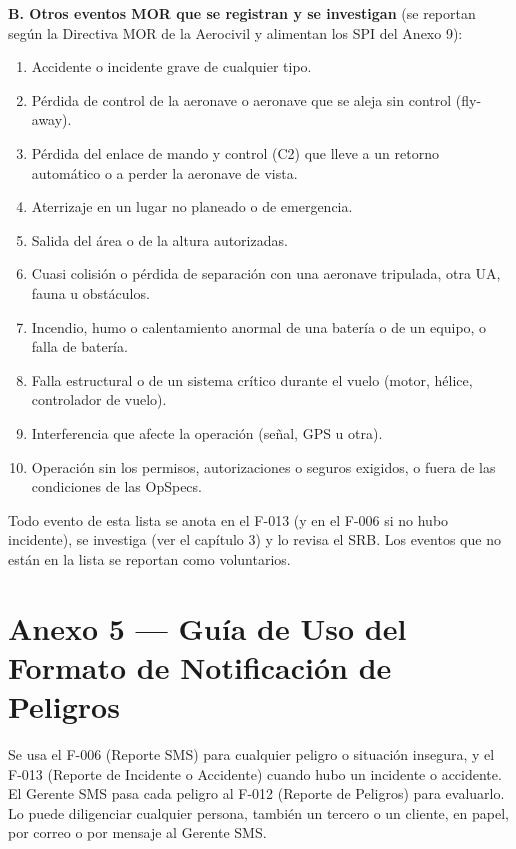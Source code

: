 \textbf{B. Otros eventos MOR que se registran y se investigan} (se reportan según la Directiva MOR de la Aerocivil y alimentan los SPI del Anexo 9):
\begin{enumerate}
    \item Accidente o incidente grave de cualquier tipo.
    \item Pérdida de control de la aeronave o aeronave que se aleja sin control (fly-away).
    \item Pérdida del enlace de mando y control (C2) que lleve a un retorno automático o a perder la aeronave de vista.
    \item Aterrizaje en un lugar no planeado o de emergencia.
    \item Salida del área o de la altura autorizadas.
    \item Cuasi colisión o pérdida de separación con una aeronave tripulada, otra UA, fauna u obstáculos.
    \item Incendio, humo o calentamiento anormal de una batería o de un equipo, o falla de batería.
    \item Falla estructural o de un sistema crítico durante el vuelo (motor, hélice, controlador de vuelo).
    \item Interferencia que afecte la operación (señal, GPS u otra).
    \item Operación sin los permisos, autorizaciones o seguros exigidos, o fuera de las condiciones de las OpSpecs.
\end{enumerate}

Todo evento de esta lista se anota en el F-013 (y en el F-006 si no hubo incidente), se investiga (ver el capítulo 3) y lo revisa el SRB. Los eventos que no están en la lista se reportan como voluntarios.

\clearpage
\section*{Anexo 5 --- Guía de Uso del Formato de Notificación de Peligros}
Se usa el F-006 (Reporte SMS) para cualquier peligro o situación insegura, y el F-013 (Reporte de Incidente o Accidente) cuando hubo un incidente o accidente. El Gerente SMS pasa cada peligro al F-012 (Reporte de Peligros) para evaluarlo. Lo puede diligenciar cualquier persona, también un tercero o un cliente, en papel, por correo o por mensaje al Gerente SMS.

